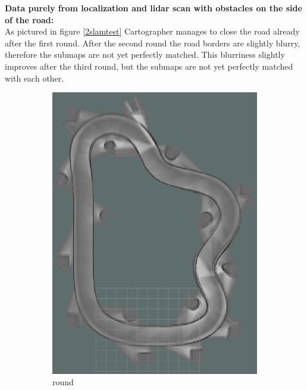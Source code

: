 \textbf{Data purely from localization and lidar scan with obstacles on the side of the road:}\\


As pictured in figure \ref{2slamtest} Cartographer manages to close the road already after the first round. After the second round the road borders are slightly blurry, therefore the submaps are not yet perfectly matched. This blurriness slightly improves after the third round, but the submaps are not yet perfectly matched with each other.

\begin{figure}[H]
	\centering
	\begin{subfigure}{.3\linewidth}
		\includegraphics[width=\textwidth]{Pictures/2slamtest1}
		\caption{ round}
		\end{subfigure}	
	\begin{subfigure}{.3\linewidth}

\end{subfigure}
\end{figure}
